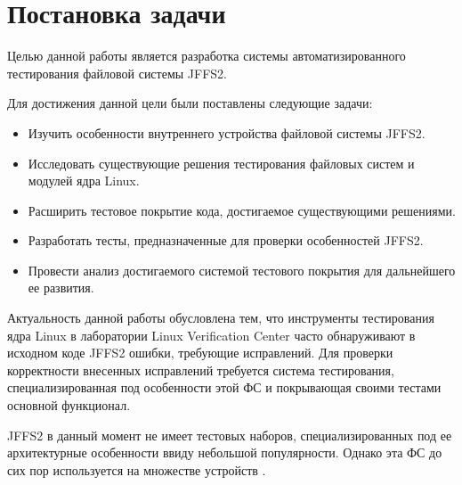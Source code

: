 \section{Постановка задачи}
\label{sec:Chapter1} 

Целью данной работы является разработка системы автоматизированного тестирования файловой системы JFFS2.

Для достижения данной цели были поставлены следующие задачи:

\begin{itemize}
	\item Изучить особенности внутреннего устройства файловой системы JFFS2.
	\item Исследовать существующие решения тестирования файловых систем и модулей ядра Linux.
	\item Расширить тестовое покрытие кода, достигаемое существующими решениями.
	\item Разработать тесты, предназначенные для проверки особенностей JFFS2.
	\item Провести анализ достигаемого системой тестового покрытия для дальнейшего ее развития.
\end{itemize}

Актуальность данной работы обусловлена тем, что инструменты тестирования ядра Linux в лаборатории Linux Verification Center \cite{lvc} часто обнаруживают в исходном коде JFFS2 ошибки, требующие исправлений. Для проверки корректности внесенных исправлений требуется система тестирования, специализированная под особенности этой ФС и покрывающая своими тестами основной функционал.

JFFS2 в данный момент не имеет тестовых наборов, специализированных под ее архитектурные особенности ввиду небольшой популярности. Однако эта ФС до сих пор используется на множестве устройств \cite{embedded}.

\newpage
